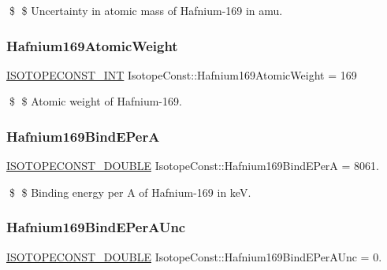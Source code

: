 \$ \$ Uncertainty in atomic mass of Hafnium-\/169 in amu. \mbox{\label{group___isotope_const-_hafnium-_hf169_ga5012f5253bf8d30a9d6e433e0fd92521}} 
\subsubsection{\texorpdfstring{Hafnium169\+Atomic\+Weight}{Hafnium169AtomicWeight}}
{\footnotesize\ttfamily \mbox{\hyperlink{group___isotope_const-_macros_ga5f18360b3e99483a35c32d789e62621c}{I\+S\+O\+T\+O\+P\+E\+C\+O\+N\+S\+T\+\_\+\+I\+NT}} Isotope\+Const\+::\+Hafnium169\+Atomic\+Weight = 169}

\$ \$ Atomic weight of Hafnium-\/169. \mbox{\label{group___isotope_const-_hafnium-_hf169_ga6a3ea2ab672df7c4b85e9418566e32d4}} 
\subsubsection{\texorpdfstring{Hafnium169\+Bind\+E\+PerA}{Hafnium169BindEPerA}}
{\footnotesize\ttfamily \mbox{\hyperlink{group___isotope_const-_macros_ga8f45a7272ce02c0b4c65c44636ed719a}{I\+S\+O\+T\+O\+P\+E\+C\+O\+N\+S\+T\+\_\+\+D\+O\+U\+B\+LE}} Isotope\+Const\+::\+Hafnium169\+Bind\+E\+PerA = 8061.}

\$ \$ Binding energy per A of Hafnium-\/169 in keV. \mbox{\label{group___isotope_const-_hafnium-_hf169_ga13389e2662000e22d5ca7dae0eaeaaf7}} 
\subsubsection{\texorpdfstring{Hafnium169\+Bind\+E\+Per\+A\+Unc}{Hafnium169BindEPerAUnc}}
{\footnotesize\ttfamily \mbox{\hyperlink{group___isotope_const-_macros_ga8f45a7272ce02c0b4c65c44636ed719a}{I\+S\+O\+T\+O\+P\+E\+C\+O\+N\+S\+T\+\_\+\+D\+O\+U\+B\+LE}} Isotope\+Const\+::\+Hafnium169\+Bind\+E\+Per\+A\+Unc = 0.}

